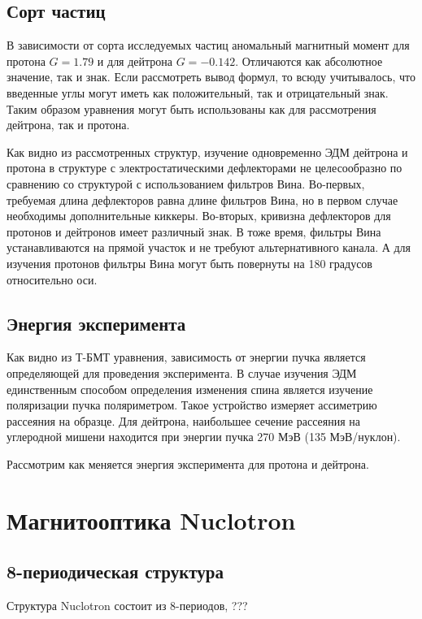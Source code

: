 	\subsection{Сорт частиц}\label{sec:EDM/requirements/particles}
	
\par В зависимости от сорта исследуемых частиц аномальный магнитный момент для протона $G=1.79$ и для дейтрона $G=-0.142$. Отличаются как абсолютное значение, так и знак. Если рассмотреть вывод формул, то всюду учитывалось, что введенные углы могут иметь как положительный, так и отрицательный знак. Таким образом уравнения могут быть использованы как для рассмотрения дейтрона, так и протона. 

\par  Как видно из рассмотренных структур, изучение одновременно ЭДМ дейтрона и протона в структуре с электростатическими дефлекторами не целесообразно по сравнению со структурой с использованием фильтров Вина. Во-первых, требуемая длина дефлекторов равна длине фильтров Вина, но в первом случае необходимы дополнительные киккеры. Во-вторых, кривизна дефлекторов для протонов и дейтронов имеет различный знак. В тоже время, фильтры Вина устанавливаются на прямой участок и не требуют альтернативного канала. А для изучения протонов фильтры Вина могут быть повернуты на 180 градусов относительно оси.

	\subsection{Энергия эксперимента}\label{sec:EDM/requirements/energy}
\par Как видно из Т-БМТ уравнения, зависимость от энергии пучка является определяющей для проведения эксперимента. В случае изучения ЭДМ единственным способом определения изменения спина является изучение поляризации пучка поляриметром. Такое устройство измеряет ассиметрию рассеяния на образце. Для дейтрона, наибольшее сечение рассеяния на углеродной мишени находится при энергии пучка 270 МэВ (135 МэВ/нуклон).

\par Рассмотрим как меняется энергия эксперимента для протона и дейтрона. 
	
	\section{Магнитооптика Nuclotron}\label{sec:EDM/optics}
	\subsection{8-периодическая структура}\label{sec:EDM/optics/8period}
\par Структура Nuclotron состоит из 8-периодов, ???

